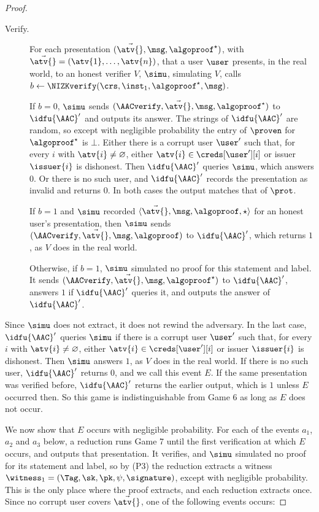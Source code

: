 \begin{proof}
\begin{description}
    \item[Verify.] For each presentation $(\vec{\atv{}}, \msg, \algoproof^\star)$,
with $\vec{\atv{}} = (\atv{1}, \ldots, \atv{n})$, that a user $\user$ presents,
in the real world, to an honest verifier $V$, $\simu$, simulating $V$, calls
$b \leftarrow \NIZKverify(\crs, \inst_1, \algoproof^\star, \msg)$.

      If $b = 0$, $\simu$ sends $(\AACverify, \vec{\atv{}}, \msg,
\algoproof^\star)$ to $\idfu{\AAC}'$ and outputs its answer. The strings of
$\idfu{\AAC}'$ are random, so except with negligible probability the entry of
$\proven$ for $\algoproof^\star$ is $\bot$. Either there is a corrupt user
$\user'$ such that, for every $i$ with $\atv{i} \neq \varnothing$, either
$\atv{i} \in \creds[\user'][i]$ or issuer $\issuer{i}$ is dishonest. Then
$\idfu{\AAC}'$ queries $\simu$, which answers $0$. Or there is no such user, and
$\idfu{\AAC}'$ records the presentation as invalid and returns $0$. In both
cases the output matches that of $\prot$.

      If $b = 1$ and $\simu$ recorded $\langle \vec{\atv{}}, \msg, \algoproof,
\star \rangle$ for an honest user's presentation, then $\simu$ sends
$(\AACverify, \vec{\atv{}}, \msg, \algoproof)$ to $\idfu{\AAC}'$, which
returns $1$, as $V$ does in the real world.

      Otherwise, if $b = 1$, $\simu$ simulated no proof for this statement and
label. It sends $(\AACverify, \vec{\atv{}}, \msg, \algoproof^\star)$ to
$\idfu{\AAC}'$, answers $1$ if $\idfu{\AAC}'$ queries it, and outputs the
answer of $\idfu{\AAC}'$.

  \end{description}

  Since $\simu$ does not extract, it does not rewind the adversary. In the last case,
$\idfu{\AAC}'$ queries $\simu$ if there is a corrupt user $\user'$ such that,
for every $i$ with $\atv{i} \neq \varnothing$, either $\atv{i} \in
\creds[\user'][i]$ or issuer $\issuer{i}$ is dishonest. Then $\simu$ answers $1$,
as $V$ does in the real world. If there is no such user, $\idfu{\AAC}'$ returns
$0$, and we call this event $E$. If the same presentation was verified before,
$\idfu{\AAC}'$ returns the earlier output, which is $1$ unless $E$ occurred
then. So this game is indistinguishable from Game 6 as long as $E$ does not
occur.

  We now show that $E$ occurs with negligible probability. For each of the
events $a_1$, $a_2$ and $a_3$ below, a reduction runs Game 7 until the first
verification at which $E$ occurs, and outputs that presentation. It verifies,
and $\simu$ simulated no proof for its statement and label, so by (P3) the
reduction extracts a witness $\witness_1 = (\Tag, \sk, \pk, \psi, \signature)$,
except with negligible probability. This is the only place where the proof
extracts, and each reduction extracts once. Since no corrupt user covers
$\vec{\atv{}}$, one of the following events occurs:


\end{proof}
